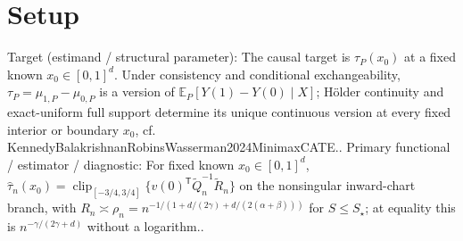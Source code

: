 \documentclass{article}
\begin{document}
\section{Setup}

Target (estimand / structural parameter): The causal target is \(\tau_P(x_0)\) at a fixed known \(x_0\in[0,1]^d\). Under consistency and conditional exchangeability, \(\tau_P=\mu_{1,P}-\mu_{0,P}\) is a version of \(\mathbb E_P[Y(1)-Y(0)\mid X]\); H\"older continuity and exact-uniform full support determine its unique continuous version at every fixed interior or boundary \(x_0\), cf. KennedyBalakrishnanRobinsWasserman2024MinimaxCATE..
Primary functional / estimator / diagnostic: For fixed known \(x_0\in[0,1]^d\), \(\widehat\tau_n(x_0)=\operatorname{clip}_{[-3/4,3/4]}\{v(0)^{\mathsf T}\widetilde Q_n^{-1}\widetilde R_n\}\) on the nonsingular inward-chart branch, with \(R_n\asymp\rho_n=n^{-1/(1+d/(2\gamma)+d/(2(\alpha+\beta)))}\) for \(S\le S_\star\); at equality this is \(n^{-\gamma/(2\gamma+d)}\) without a logarithm..
\end{document}
